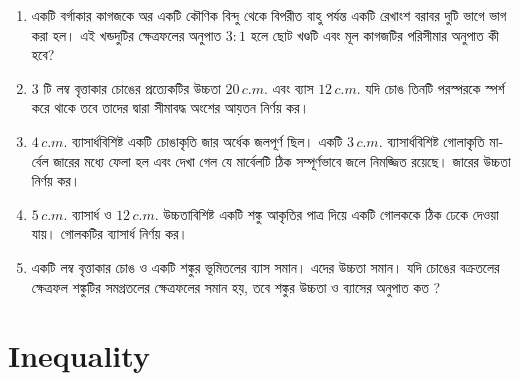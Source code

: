 \documentclass[11pt, a4paper]{article}
\begin{document}
\begin{enumerate}

	\item \textbengali{একটি বর্গাকার কাগজকে অর একটি কৌণিক বিন্দু থেকে বিপরীত বাহু পর্যন্ত একটি রেখাংশ বরাবর দুটি ভাগে ভাগ করা হল। এই খন্ডদুটির ক্ষেত্রফলের অনুপাত} $3:1$ \textbengali{হলে ছোট খণ্ডটি এবং মূল কাগজটির পরিসীমার অনুপাত কী হবে?}
	
	\item $3$ \textbengali{টি লম্ব বৃত্তাকার চোঙের প্রত্যেকটির উচ্চতা} $20\,c.m.$ \textbengali{এবং ব্যাস} $12\,c.m.$ \textbengali{যদি চোঙ তিনটি পরস্পরকে স্পর্শ করে থাকে তবে তাদের দ্বারা সীমাবদ্ধ অংশের আয়তন নির্ণয় কর।}

	\item $4\,c.m.$ \textbengali{ব্যাসার্ধবিশিষ্ট একটি চোঙাকৃতি জার অর্ধেক জলপূর্ণ ছিল। একটি} $3\,c.m.$ \textbengali{ব্যাসার্ধবিশিষ্ট গোলাকৃতি মার্বেল জারের মধ্যে ফেলা হল এবং দেখা গেল যে মার্বেলটি ঠিক সম্পূর্ণভাবে জলে নিমজ্জিত রয়েছে। জারের উচ্চতা নির্ণয় কর।}
	
	\item $5\,c.m.$ \textbengali{ব্যাসার্ধ ও} $12\,c.m.$ \textbengali{উচ্চতাবিশিষ্ট একটি শঙ্কু আকৃতির পাত্র দিয়ে একটি গোলককে ঠিক ঢেকে দেওয়া যায়। গোলকটির ব্যাসার্ধ নির্ণয় কর।}
	
	\item \textbengali{একটি লম্ব বৃত্তাকার চোঙ ও একটি শঙ্কুর ভূমিতলের ব্যাস সমান। এদের উচ্চতা সমান। যদি চোঙের বক্রতলের ক্ষেত্রফল শঙ্কুটির সমগ্রতলের ক্ষেত্রফলের সমান হয়, তবে শঙ্কুর উচ্চতা ও ব্যাসের অনুপাত কত ?}

\end{enumerate}


\section{Inequality}
\end{document}
